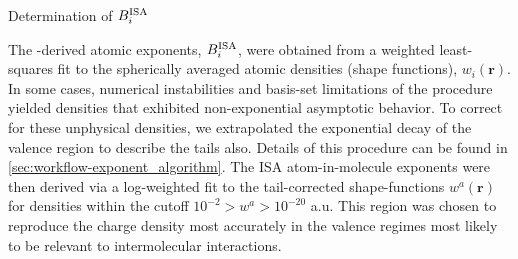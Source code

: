 \begin{subsection}{Determination of $B^{\text{ISA}}_{i}$}


The \bsisa-derived atomic exponents, $B^{\text{ISA}}_{i}$, were obtained from a weighted
least-squares fit to the spherically averaged \bsisa atomic densities (shape functions),
$w_i(\mathbf{r})$.
In some cases, numerical instabilities and basis-set limitations of the \bsisa procedure
yielded densities that exhibited non-exponential asymptotic behavior.\cite{Misquitta2014}
To correct for these unphysical densities, we extrapolated the exponential decay
of the valence region to describe the \bsisa tails also. 
Details of this procedure can be found in
\cref{sec:workflow-exponent_algorithm}.
The ISA atom-in-molecule exponents were then derived via a log-weighted fit to
the tail-corrected shape-functions $w^a(\mathbf{r})$ for densities within the cutoff
$10^{-2} > w^a > 10^{-20}$ a.u.  This region was chosen to
reproduce the charge density most accurately in the valence regimes most likely to be relevant to
intermolecular interactions.


\end{subsection}

